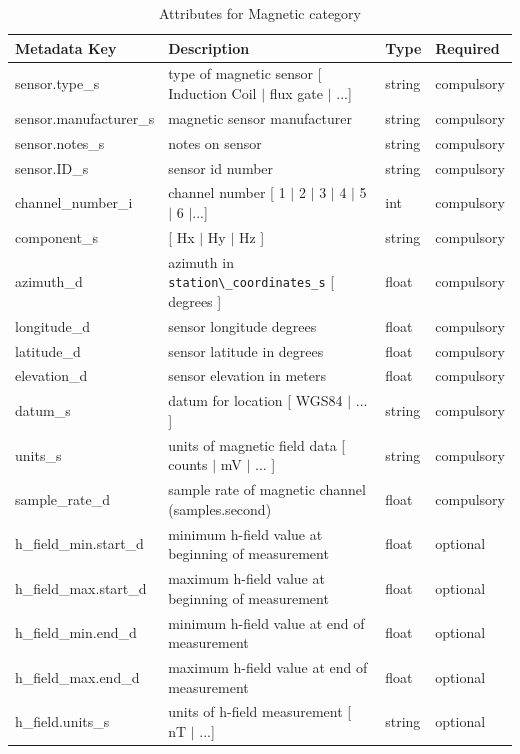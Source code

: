 \documentclass{article}
\begin{document}
\begin{table}[htb!]
	\caption[Attributes for Magnetic Channel]{Attributes for Magnetic category}
	\begin{tabular}{|l|p{3in}|l|l|}
		\hline
		\textbf{Metadata Key} & \textbf{Description} & \textbf{Type} & \textbf{Required} \\ \hline
		sensor.type\_s & type of magnetic sensor [ Induction Coil $|$ flux gate $|$ ...] & string & compulsory \\ \hline
		sensor.manufacturer\_s & magnetic sensor manufacturer & string &  compulsory \\ \hline
		sensor.notes\_s & notes on sensor & string & compulsory \\ \hline
		sensor.ID\_s & sensor id number & string &  compulsory \\ \hline
		channel\_number\_i & channel number [ 1 $|$ 2 $|$ 3 $|$ 4 $|$ 5 $|$ 6 $|$...] & int &  compulsory \\ \hline
		component\_s & [ Hx $|$ Hy $|$ Hz ] & string  &  compulsory \\ \hline
		azimuth\_d & azimuth in \verb|station\_coordinates_s| [ degrees ]& float & compulsory \\ \hline
		longitude\_d & sensor longitude degrees & float & compulsory \\ \hline
		latitude\_d & sensor latitude in degrees & float &  compulsory \\ \hline
		elevation\_d & sensor elevation in meters & float &  compulsory \\ \hline
		datum\_s & datum for location [ WGS84 $|$ ... ] & string &  compulsory\\ \hline
		units\_s & units of magnetic field data [ counts $|$ mV $|$ ... ] & string &  compulsory \\ \hline
		sample\_rate\_d & sample rate of magnetic channel (samples.second) & float &  compulsory \\ \hline
		h\_field\_min.start\_d & minimum h-field value at beginning of measurement & float &  optional \\ \hline
		h\_field\_max.start\_d & maximum h-field value at beginning of measurement & float &  optional\\ \hline
		h\_field\_min.end\_d & minimum h-field value at end of measurement & float &  optional\\ \hline
		h\_field\_max.end\_d & maximum h-field value at end of measurement & float &  optional\\ \hline
		h\_field.units\_s & units of h-field measurement [ nT $|$ ...] & string &   optional \\ \hline

\end{tabular}
\end{table}
\end{document}
